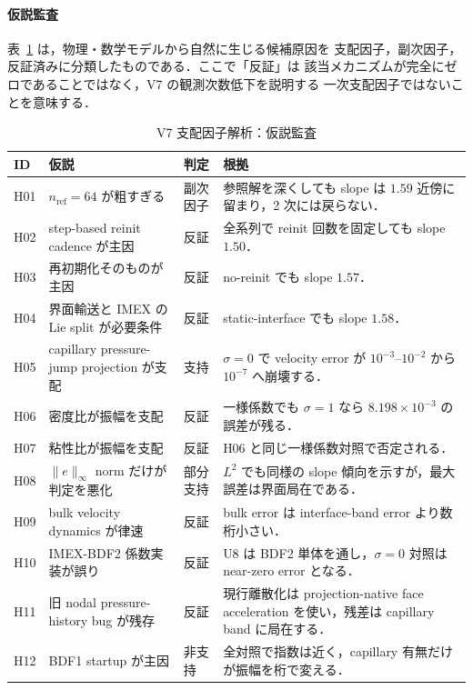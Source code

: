 \paragraph{仮説監査}

表~\ref{tab:v7_rca_hypotheses} は，物理・数学モデルから自然に生じる候補原因を
支配因子，副次因子，反証済みに分類したものである．ここで「反証」は
該当メカニズムが完全にゼロであることではなく，V7 の観測次数低下を説明する
一次支配因子ではないことを意味する．

\begin{table}[htbp]
\centering\scriptsize
\caption{V7 支配因子解析：仮説監査}
\label{tab:v7_rca_hypotheses}
\begin{tabularx}{\linewidth}{>{\raggedright\arraybackslash}p{9mm}X>{\raggedright\arraybackslash}p{23mm}X}
\toprule
ID & 仮説 & 判定 & 根拠 \\
\midrule
H01 & $n_{\mathrm{ref}}=64$ が粗すぎる & 副次因子 &
参照解を深くしても slope は $1.59$ 近傍に留まり，2 次には戻らない．\\
H02 & step-based reinit cadence が主因 & 反証 &
全系列で reinit 回数を固定しても slope $1.50$．\\
H03 & 再初期化そのものが主因 & 反証 &
no-reinit でも slope $1.57$．\\
H04 & 界面輸送と IMEX の Lie split が必要条件 & 反証 &
static-interface でも slope $1.58$．\\
H05 & capillary pressure-jump projection が支配 & 支持 &
$\sigma=0$ で velocity error が $10^{-3}$--$10^{-2}$ から $10^{-7}$ へ崩壊する．\\
H06 & 密度比が振幅を支配 & 反証 &
一様係数でも $\sigma=1$ なら $8.198\times10^{-3}$ の誤差が残る．\\
H07 & 粘性比が振幅を支配 & 反証 &
H06 と同じ一様係数対照で否定される．\\
H08 & $\|e\|_\infty$ norm だけが判定を悪化 & 部分支持 &
$L^2$ でも同様の slope 傾向を示すが，最大誤差は界面局在である．\\
H09 & bulk velocity dynamics が律速 & 反証 &
bulk error は interface-band error より数桁小さい．\\
H10 & IMEX-BDF2 係数実装が誤り & 反証 &
U8 は BDF2 単体を通し，$\sigma=0$ 対照は near-zero error となる．\\
H11 & 旧 nodal pressure-history bug が残存 & 反証 &
現行離散化は projection-native face acceleration を使い，残差は capillary band に局在する．\\
H12 & BDF1 startup が主因 & 非支持 &
全対照で指数は近く，capillary 有無だけが振幅を桁で変える．\\

\end{tabularx}
\end{table}
